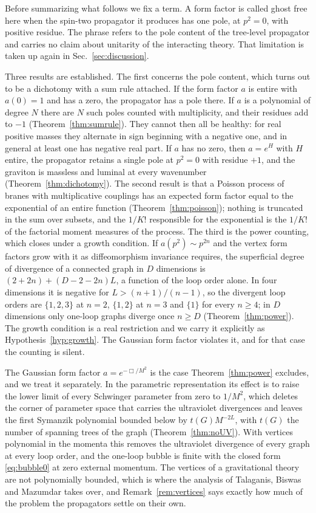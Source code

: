 \documentclass[aps,prd,10pt,twocolumn,superscriptaddress,nofootinbib,floatfix,longbibliography,showpacs,showkeys]{revtex4-2}
\theoremstyle{plain}
\theoremstyle{definition}
\theoremstyle{remark}
\begin{document}
Before summarizing what follows we fix a term. A form factor is called ghost free here when the spin-two propagator it produces has one pole, at $p^2=0$, with positive residue. The phrase refers to the pole content of the tree-level propagator and carries no claim about unitarity of the interacting theory. That limitation is taken up again in Sec.~\ref{sec:discussion}.

Three results are established. The first concerns the pole content, which turns out to be a dichotomy with a sum rule attached. If the form factor $a$ is entire with $a(0)=1$ and has a zero, the propagator has a pole there. If $a$ is a polynomial of degree $N$ there are $N$ such poles counted with multiplicity, and their residues add to $-1$ (Theorem~\ref{thm:sumrule}). They cannot then all be healthy: for real positive masses they alternate in sign beginning with a negative one, and in general at least one has negative real part. If $a$ has no zero, then $a=e^{H}$ with $H$ entire, the propagator retains a single pole at $p^2=0$ with residue $+1$, and the graviton is massless and luminal at every wavenumber (Theorem~\ref{thm:dichotomy}). The second result is that a Poisson process of branes with multiplicative couplings has an expected form factor equal to the exponential of an entire function (Theorem~\ref{thm:poisson}); nothing is truncated in the sum over subsets, and the $1/K!$ responsible for the exponential is the $1/K!$ of the factorial moment measures of the process. The third is the power counting, which closes under a growth condition. If $a(p^2)\sim p^{2n}$ and the vertex form factors grow with it as diffeomorphism invariance requires, the superficial degree of divergence of a connected graph in $D$ dimensions is $(2+2n)+(D-2-2n)L$, a function of the loop order alone. In four dimensions it is negative for $L>(n+1)/(n-1)$, so the divergent loop orders are $\{1,2,3\}$ at $n=2$, $\{1,2\}$ at $n=3$ and $\{1\}$ for every $n\ge4$; in $D$ dimensions only one-loop graphs diverge once $n\ge D$ (Theorem~\ref{thm:power}). The growth condition is a real restriction and we carry it explicitly as Hypothesis~\ref{hyp:growth}. The Gaussian form factor violates it, and for that case the counting is silent.

The Gaussian form factor $a=e^{-\Box/M^2}$ is the case Theorem~\ref{thm:power} excludes, and we treat it separately. In the parametric representation its effect is to raise the lower limit of every Schwinger parameter from zero to $1/M^2$, which deletes the corner of parameter space that carries the ultraviolet divergences and leaves the first Symanzik polynomial bounded below by $t(G)M^{-2L}$, with $t(G)$ the number of spanning trees of the graph (Theorem~\ref{thm:noUV}). With vertices polynomial in the momenta this removes the ultraviolet divergence of every graph at every loop order, and the one-loop bubble is finite with the closed form \eqref{eq:bubble0} at zero external momentum. The vertices of a gravitational theory are not polynomially bounded, which is where the analysis of Talaganis, Biswas and Mazumdar \cite{Talaganis2015} takes over, and Remark~\ref{rem:vertices} says exactly how much of the problem the propagators settle on their own.
\end{document}
